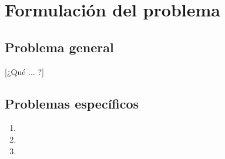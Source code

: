\section{Formulación del problema}

\subsection{Problema general}
[¿Qué ... ?]

\subsection{Problemas específicos}
\begin{enumerate}
  \item [¿Qué ... ?]
  \item [¿En qué medida ... ?]
  \item [¿Qué efecto ... ?]
\end{enumerate}
